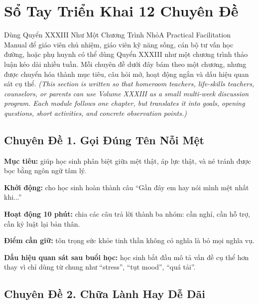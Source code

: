 \chapter*{Sổ Tay Triển Khai 12 Chuyên Đề}

\begin{truyen}{Dùng Quyển XXXIII Như Một Chương Trình Nhỏ}{A Practical Facilitation Manual}
 để giáo viên chủ nhiệm, giáo viên kỹ năng sống, cán bộ tư vấn học đường, hoặc phụ huynh có thể dùng Quyển XXXIII như một chương trình thảo luận kéo dài nhiều tuần. Mỗi chuyên đề dưới đây bám theo một chương, nhưng được chuyển hóa thành mục tiêu, câu hỏi mở, hoạt động ngắn và dấu hiệu quan sát cụ thể.
\textit{(This section is written so that homeroom teachers, life-skills teachers, counselors, or parents can use Volume XXXIII as a small multi-week discussion program. Each module follows one chapter, but translates it into goals, opening questions, short activities, and concrete observation points.)}
\end{truyen}

\section*{Chuyên Đề 1. Gọi Đúng Tên Nỗi Mệt}

\begin{goigiaovien}
\textbf{Mục tiêu:} giúp học sinh phân biệt giữa mệt thật, áp lực thật, và né tránh được bọc bằng ngôn ngữ tâm lý.

\textbf{Khởi động:} cho học sinh hoàn thành câu ``Gần đây em hay nói mình mệt nhất khi...''

\textbf{Hoạt động 10 phút:} chia các câu trả lời thành ba nhóm: cần nghỉ, cần hỗ trợ, cần kỷ luật lại bản thân.

\textbf{Điểm cần giữ:} tôn trọng sức khỏe tinh thần không có nghĩa là bỏ mọi nghĩa vụ.

\textbf{Dấu hiệu quan sát sau buổi học:} học sinh bắt đầu mô tả vấn đề cụ thể hơn thay vì chỉ dùng từ chung như ``stress'', ``tụt mood'', ``quá tải''.
\end{goigiaovien}

\section*{Chuyên Đề 2. Chữa Lành Hay Dễ Dãi}

